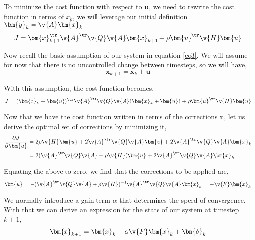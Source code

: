 \documentclass[SE,authoryear,toc]{lsstdoc}
\begin{document}
To minimize the cost function with respect to $\bm{u}$, we need to rewrite the cost function in terms of $x_k$, we will leverage our initial definition $\bm{y}_k = \v{A} \bm{x}_k$
\begin{equation}
     J = \bm{x}_{k+1}^{\tr}\v{A}^{\tr}\v{Q}\v{A}\bm{x}_{k+1} + \rho \bm{u}^{\tr}\v{H}\bm{u}
\end{equation}

Now recall the basic assumption of our system in equation \ref{eq3}. We will assume for now that there is no uncontrolled change between timesteps, so we will have, 
\begin{equation}
    \bm{x}_{k+1} = \bm{x}_k + \bm{u}
\end{equation}

With this assumption, the cost function becomes, 
\begin{equation}
     J = (\bm{x}_{k} + \bm{u})^{\tr}\v{A}^{\tr}\v{Q}\v{A}(\bm{x}_{k} + \bm{u}) + \rho \bm{u}^{\tr}\v{H}\bm{u}
\end{equation}

Now that we have the cost function written in terms of the corrections $\bm{u}$, let us derive the optimal set of corrections by minimizing it, 
\begin{equation}
\begin{split}
    \frac{\partial J}{\partial \bm{u}} & = 2\rho \v{H} \bm{u} + 2 \v{A}^{\tr}\v{Q}\v{A} \bm{u} + 2\v{A}^{\tr}\v{Q}\v{A} \bm{x}_k \\
    & = 2( \v{A}^{\tr}\v{Q}\v{A} + \rho \v{H})\bm{u} + 2 \v{A}^{\tr}\v{Q}\v{A} \bm{x}_k
\end{split}
\end{equation}

Equating the above to zero, we find that the corrections to be applied are, 
\begin{equation}
    \bm{u} = -(\v{A}^{\tr}\v{Q}\v{A} + \rho \v{H})^{-1}\v{A}^{\tr}\v{Q}\v{A}\bm{x}_k = -\v{F}\bm{x}_k
\end{equation}

We normally introduce a gain term $\alpha$ that determines the speed of convergence. With that we can derive an expression for the state of our system at timestep $k+1$,
\begin{equation}\label{eq4}
    \bm{x}_{k + 1} = \bm{x}_{k} - \alpha\v{F}\bm{x}_k + \bm{\delta}_{k}
\end{equation}
\end{document}
